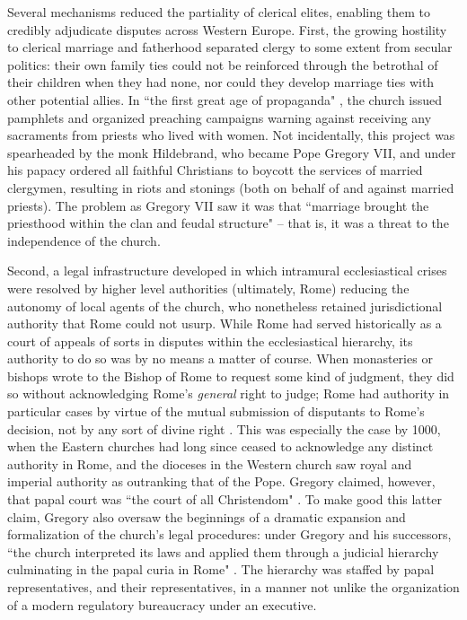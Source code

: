 \documentclass[12pt]{article}
\theoremstyle{definition}
\theoremstyle{remark}
\begin{document}
Several mechanisms reduced the partiality of clerical elites, enabling them to credibly adjudicate disputes across Western Europe. First, the growing hostility to clerical marriage and fatherhood separated clergy to some extent from secular politics: their own family ties could not be reinforced through the betrothal of their children when they had none, nor could they develop marriage ties with other potential allies. In ``the first great age of propaganda" \citep[xiv--xv]{bennett_1936}, the church issued pamphlets and organized preaching campaigns warning against receiving any sacraments from priests who lived with women. Not incidentally, this project was spearheaded by the monk Hildebrand, who became Pope Gregory VII, and under his papacy ordered all faithful Christians to boycott the services of married clergymen, resulting in riots and stonings (both on behalf of and against married priests). The problem as Gregory VII saw it was that ``marriage brought the priesthood within the clan and feudal structure" \citep[90]{berman_1983} -- that is, it was a threat to the independence of the church.

Second, a legal infrastructure developed in which intramural ecclesiastical crises were resolved by higher level authorities (ultimately, Rome) reducing the autonomy of local agents of the church, who nonetheless retained jurisdictional authority that Rome could not usurp. While Rome had served historically as a court of appeals of sorts in disputes within the ecclesiastical hierarchy, its authority to do so was by no means a matter of course. When monasteries or bishops wrote to the Bishop of Rome to request some kind of judgment, they did so without acknowledging Rome's \textit{general} right to judge; Rome had authority in particular cases by virtue of the mutual submission of disputants to Rome's decision, not by any sort of divine right \citep{davray_2023}. This was especially the case by 1000, when the Eastern churches had long since ceased to acknowledge any distinct authority in Rome, and the dioceses in the Western church saw royal and imperial authority as outranking that of the Pope. Gregory claimed, however, that papal court was ``the court of all Christendom" \citep[7]{bernheim_1896}. To make good this latter claim, Gregory also oversaw the beginnings of a dramatic expansion and formalization of the church's legal procedures: under Gregory and his successors, ``the church interpreted its laws and applied them through a judicial hierarchy culminating in the papal curia in Rome" \citep[113]{berman_1983}. The hierarchy was staffed by papal representatives, and their representatives, in a manner not unlike the organization of a modern regulatory bureaucracy under an executive.
\end{document}

